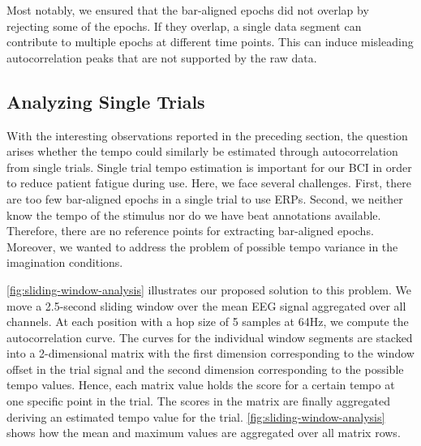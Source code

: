Most notably, we ensured that the bar-aligned epochs did not overlap by rejecting some of the epochs.
If they overlap, a single data segment can contribute to multiple epochs at different time points.
This can induce misleading autocorrelation peaks that are not supported by the raw data.


\subsection*{Analyzing Single Trials}

With the interesting observations reported in the preceding section, the question arises whether the tempo could similarly be estimated through autocorrelation from single trials. 
Single trial tempo estimation is important for our BCI in order to reduce patient fatigue during use.
Here, we face several challenges. 
First, there are too few bar-aligned epochs in a single trial to use ERPs.
Second, we neither know the tempo of the stimulus nor do we have beat annotations available.
Therefore, there are no reference points for extracting bar-aligned epochs.
Moreover, we wanted to address the problem of possible tempo variance in the imagination conditions.

\autoref{fig:sliding-window-analysis} illustrates our proposed solution to this problem.
We move a 2.5-second sliding window over the mean EEG signal aggregated over all channels.
At each position with a hop size of 5 samples at 64Hz, we compute the autocorrelation curve.
The curves for the individual window segments are stacked into a 2-dimensional matrix with the first dimension corresponding to the window offset in the trial signal and the second dimension corresponding to the possible tempo values.
Hence, each matrix value holds the score for a certain tempo at one specific point in the trial.
The scores in the matrix are finally aggregated deriving an estimated tempo value for the trial.
\autoref{fig:sliding-window-analysis} shows how the mean and maximum values are aggregated over all matrix rows.

